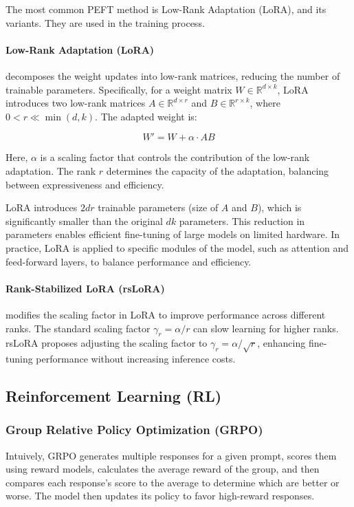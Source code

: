 \documentclass[11pt]{article}
\begin{document}
The most common PEFT method is Low-Rank Adaptation (LoRA), and its variants. They are used in the training process.

\paragraph{Low-Rank Adaptation (LoRA)} decomposes the weight updates into low-rank matrices, reducing the number of trainable parameters. Specifically, for a weight matrix \( W \in \mathbb{R}^{d \times k} \), LoRA introduces two low-rank matrices \( A \in \mathbb{R}^{d \times r} \) and \( B \in \mathbb{R}^{r \times k} \), where \( 0 < r \ll \min(d, k) \). The adapted weight is:

\[
W' = W + \alpha \cdot A B
\]

Here, \( \alpha \) is a scaling factor that controls the contribution of the low-rank adaptation. The rank \( r \) determines the capacity of the adaptation, balancing between expressiveness and efficiency.

LoRA introduces \( 2dr \) trainable parameters (size of \( A \) and \( B \)), which is significantly smaller than the original \( dk \) parameters. This reduction in parameters enables efficient fine-tuning of large models on limited hardware. In practice, LoRA is applied to specific modules of the model, such as attention and feed-forward layers, to balance performance and efficiency.

\paragraph{Rank-Stabilized LoRA (rsLoRA)} modifies the scaling factor in LoRA to improve performance across different ranks. The standard scaling factor \( \gamma_r = \alpha / r \) can slow learning for higher ranks. rsLoRA proposes adjusting the scaling factor to \( \gamma_r = \alpha / \sqrt{r} \), enhancing fine-tuning performance without increasing inference costs.

\subsection{Reinforcement Learning (RL)} \label{app:rl}

\subsubsection{Group Relative Policy Optimization (GRPO)} \label{app:grpo}

Intuively, GRPO generates multiple responses for a given prompt, scores them using reward models, calculates the average reward of the group, and then compares each response's score to the average to determine which are better or worse. The model then updates its policy to favor high-reward responses.
\end{document}
